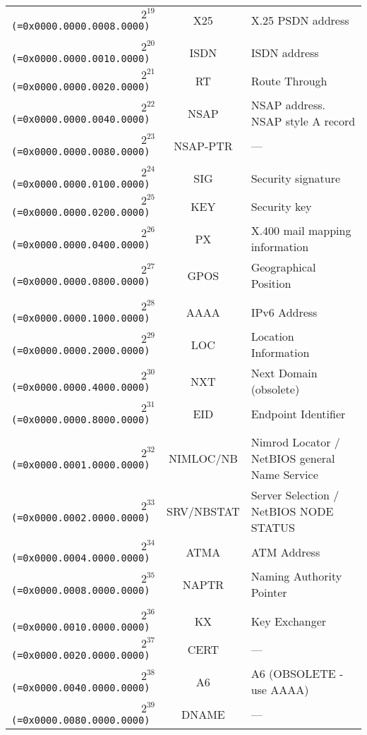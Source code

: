 \documentclass[documentation]{subfiles}
\begin{document}
\begin{longtable}{>{\tt}rcl}
    $2^{19}$ (=0x0000.0000.0008.0000) & X25         & X.25 PSDN address \\
    \\
    $2^{20}$ (=0x0000.0000.0010.0000) & ISDN        & ISDN address \\
    $2^{21}$ (=0x0000.0000.0020.0000) & RT          & Route Through \\
    $2^{22}$ (=0x0000.0000.0040.0000) & NSAP        & NSAP address. NSAP style A record \\
    $2^{23}$ (=0x0000.0000.0080.0000) & NSAP-PTR    & --- \\
    \\
    $2^{24}$ (=0x0000.0000.0100.0000) & SIG         & Security signature \\
    $2^{25}$ (=0x0000.0000.0200.0000) & KEY         & Security key \\
    $2^{26}$ (=0x0000.0000.0400.0000) & PX          & X.400 mail mapping information \\
    $2^{27}$ (=0x0000.0000.0800.0000) & GPOS        & Geographical Position \\
    \\
    $2^{28}$ (=0x0000.0000.1000.0000) & AAAA        & IPv6 Address \\
    $2^{29}$ (=0x0000.0000.2000.0000) & LOC         & Location Information \\
    $2^{30}$ (=0x0000.0000.4000.0000) & NXT         & Next Domain (obsolete) \\
    $2^{31}$ (=0x0000.0000.8000.0000) & EID         & Endpoint Identifier \\
    \\
    $2^{32}$ (=0x0000.0001.0000.0000) & NIMLOC/NB   & Nimrod Locator / NetBIOS general Name Service \\
    $2^{33}$ (=0x0000.0002.0000.0000) & SRV/NBSTAT  & Server Selection / NetBIOS NODE STATUS \\
    $2^{34}$ (=0x0000.0004.0000.0000) & ATMA        & ATM Address \\
    $2^{35}$ (=0x0000.0008.0000.0000) & NAPTR       & Naming Authority Pointer \\
    \\
    $2^{36}$ (=0x0000.0010.0000.0000) & KX          & Key Exchanger \\
    $2^{37}$ (=0x0000.0020.0000.0000) & CERT        & --- \\
    $2^{38}$ (=0x0000.0040.0000.0000) & A6          & A6 (OBSOLETE - use AAAA) \\
    $2^{39}$ (=0x0000.0080.0000.0000) & DNAME       & --- \\

\end{longtable}
\end{document}
